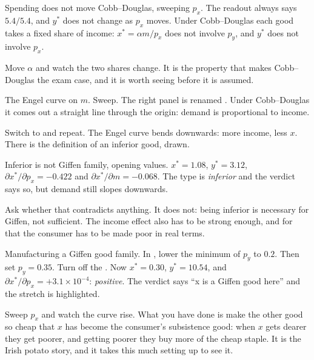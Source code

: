 \documentclass[11pt,a4paper]{appletmanual}
\begin{document}
\begin{activity}{Spending does not move}
\amset Cobb--Douglas, sweeping $p_x$.
\amexp The  readout always says $5.4 / 5.4$, and $y^\ast$ does not
change as $p_x$ moves. Under Cobb--Douglas each good takes a fixed share of
income: $x^\ast = \alpha m / p_x$ does not involve $p_y$, and $y^\ast$ does not
involve $p_x$.
\par\smallskip
Move $\alpha$ and watch the two shares change. It is the property that makes
Cobb--Douglas the exam case, and it is worth seeing before it is assumed.
\end{activity}

\begin{activity}{The Engel curve}
\amset {} on $m$. Sweep.
\amexp The right panel is renamed . Under Cobb--Douglas it
comes out a straight line through the origin: demand is proportional to income.
\par\smallskip
Switch to  and repeat. The Engel curve bends downwards: more
income, less $x$. There is the definition of an inferior good, drawn.
\end{activity}

\begin{activity}{Inferior is not Giffen}
\amset {} family, opening values.
\amexp $x^\ast = 1.08$, $y^\ast = 3.12$,
$\partial x^\ast/\partial p_x = -0.422$ and
$\partial x^\ast/\partial m = -0.068$. The type is \emph{inferior} and the
verdict says so, but demand still slopes downwards.
\par\smallskip
Ask whether that contradicts anything. It does not: being inferior is necessary
for Giffen, not sufficient. The income effect also has to be strong enough, and
for that the consumer has to be made poor in real terms.
\end{activity}

\begin{activity}{Manufacturing a Giffen good}
\amset {} family. In , lower the minimum of $p_y$ to
$0.2$. Then set $p_y = 0.35$. Turn off the .
\amexp Now $x^\ast = 0.30$, $y^\ast = 10.54$, and
$\partial x^\ast/\partial p_x = +3.1\times 10^{-4}$: \emph{positive}. The
verdict says ``x is a Giffen good here'' and the stretch is highlighted.
\par\smallskip
Sweep $p_x$ and watch the curve rise. What you have done is make the other good
so cheap that $x$ has become the consumer's subsistence good: when $x$ gets
dearer they get poorer, and getting poorer they buy more of the cheap staple.
It is the Irish potato story, and it takes this much setting up to see it.
\end{activity}
\end{document}
